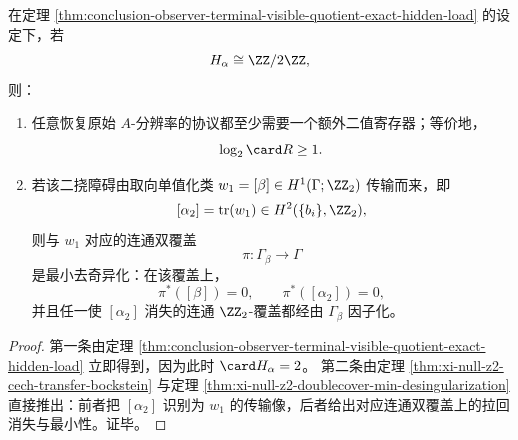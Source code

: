 \begin{corollary}\label{cor:conclusion-observer-two-torsion-onebit-minimal-desingularization}
在定理 \ref{thm:conclusion-observer-terminal-visible-quotient-exact-hidden-load} 的设定下，若
\[
H_\alpha\cong \ZZ/2\ZZ,
\]
则：
\begin{enumerate}
  \item 任意恢复原始 \(A\)-分辨率的协议都至少需要一个额外二值寄存器；等价地，
  \[
  \log_2\card R\ge 1.
  \]
  \item 若该二挠障碍由取向单值化类 \(w_1=[\beta]\in H^1(\Gamma;\ZZ_2)\) 传输而来，即
  \[
  [\alpha_2]=\operatorname{tr}(w_1)\in H^2(\{b_i\},\ZZ_2),
  \]
  则与 \(w_1\) 对应的连通双覆盖
  \[
  \pi:\Gamma_\beta\to\Gamma
  \]
  是最小去奇异化：在该覆盖上，
  \[
  \pi^\ast([\beta])=0,
  \qquad
  \pi^\ast([\alpha_2])=0,
  \]
  并且任一使 \([\alpha_2]\) 消失的连通 \(\ZZ_2\)-覆盖都经由 \(\Gamma_\beta\) 因子化。
\end{enumerate}
\end{corollary}
\begin{proof}
第一条由定理 \ref{thm:conclusion-observer-terminal-visible-quotient-exact-hidden-load} 立即得到，因为此时 \(\card H_\alpha=2\)。
第二条由定理 \ref{thm:xi-null-z2-cech-transfer-bockstein} 与定理 \ref{thm:xi-null-z2-doublecover-min-desingularization} 直接推出：前者把 \([\alpha_2]\) 识别为 \(w_1\) 的传输像，后者给出对应连通双覆盖上的拉回消失与最小性。证毕。
\end{proof}


